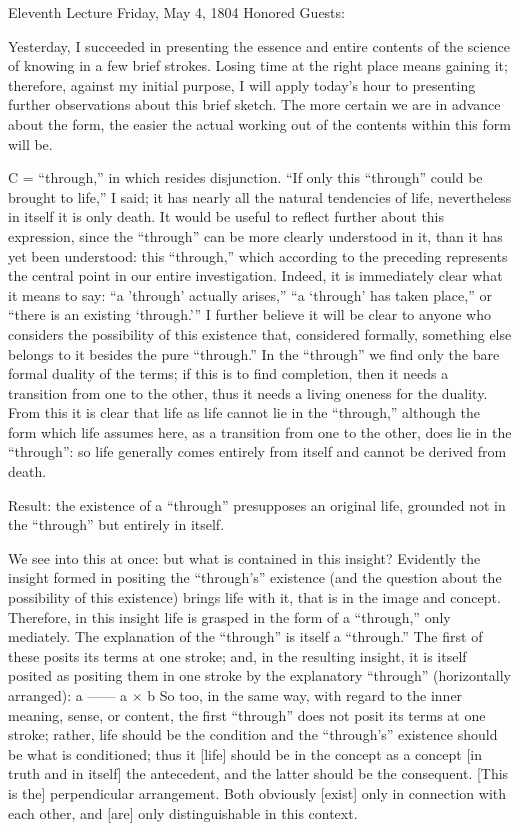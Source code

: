 Eleventh Lecture
Friday, May 4, 1804
Honored Guests:

Yesterday, I succeeded in presenting the essence
and entire contents of the science of knowing
in a few brief strokes.
Losing time at the right place means gaining it;
therefore, against my initial purpose,
I will apply today's hour to presenting
further observations about this brief sketch.
The more certain we are in advance about the form,
the easier the actual working out
of the contents within this form will be.

C = “through,” in which resides disjunction.
“If only this “through” could be brought to life,” I said;
it has nearly all the natural tendencies of life,
nevertheless in itself it is only death.
It would be useful to reflect further about this expression,
since the “through” can be more clearly understood in it,
than it has yet been understood:
this “through,” which according to the preceding
represents the central point in our entire investigation.
Indeed, it is immediately clear
what it means to say:
“a 'through' actually arises,”
“a ‘through' has taken place,”
or “there is an existing ‘through.'”
I further believe it will be clear
to anyone who considers the possibility of this existence that,
considered formally, something else belongs to it
besides the pure “through.”
In the “through” we find only
the bare formal duality of the terms;
if this is to find completion,
then it needs a transition from one to the other,
thus it needs a living oneness for the duality.
From this it is clear that life as life cannot lie in the “through,”
although the form which life assumes here,
as a transition from one to the other,
does lie in the “through”:
so life generally comes entirely from itself
and cannot be derived from death.

Result: the existence of a “through”
presupposes an original life,
grounded not in the “through”
but entirely in itself.

We see into this at once:
but what is contained in this insight?
Evidently the insight formed in positing
the “through's” existence
(and the question about the possibility of this existence)
brings life with it,
that is in the image and concept.
Therefore, in this insight life is grasped
in the form of a “through,” only mediately.
The explanation of the “through” is itself a “through.”
The first of these posits its terms at one stroke;
and, in the resulting insight,
it is itself posited as positing them in one stroke
by the explanatory “through” (horizontally arranged):
a
——
a × b
So too, in the same way, with regard to
the inner meaning, sense, or content,
the first “through” does not posit
its terms at one stroke;
rather, life should be the condition
and the “through's” existence should be
what is conditioned;
thus it [life] should be in the concept as a concept
[in truth and in itself] the antecedent,
and the latter should be the consequent.
[This is the] perpendicular arrangement.
Both obviously [exist] only in connection with
each other, and [are] only distinguishable in this context.


